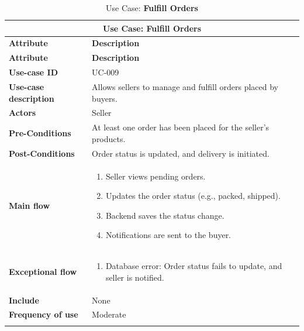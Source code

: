 \documentclass[12pt]{report}
\begin{document}
\begin{appendices}
	\begin{longtable}[H]{|l|p{9cm}||}
		\hline
		\multicolumn{2}{|c||}{\textbf{Use Case: Fulfill Orders}}                                                   \\
		\hline
		\textbf{Attribute}            & \textbf{Description}                                                       \\
		\hline
		\endfirsthead
		\hline
		\textbf{Attribute}            & \textbf{Description}                                                       \\
		\hline
		\endhead
		\textbf{Use-case ID}          & UC-009                                                                     \\
		\hline
		\textbf{Use-case description} & Allows sellers to manage and fulfill orders placed by buyers.              \\
		\hline
		\textbf{Actors}               & Seller                                                                     \\
		\hline
		\textbf{Pre-Conditions}       & At least one order has been placed for the seller's products.              \\
		\hline
		\textbf{Post-Conditions}      & Order status is updated, and delivery is initiated.                        \\
		\hline
		\textbf{Main flow}            & \begin{enumerate}
			                                \item Seller views pending orders.
			                                \item Updates the order status (e.g., packed, shipped).
			                                \item Backend saves the status change.
			                                \item Notifications are sent to the buyer.
		                                \end{enumerate}                     \\
		\hline
		\textbf{Exceptional flow}     & \begin{enumerate}
			                                \item Database error: Order status fails to update, and seller is notified.
		                                \end{enumerate} \\
		\hline
		\textbf{Include}              & None                                                                       \\
		\hline
		\textbf{Frequency of use}     & Moderate                                                                   \\
		\hline
		\hline
		\caption{Use Case: \textbf{Fulfill Orders}}\label{tab:tableFulfillOrders}
	\end{longtable}


\end{appendices}
\end{document}
